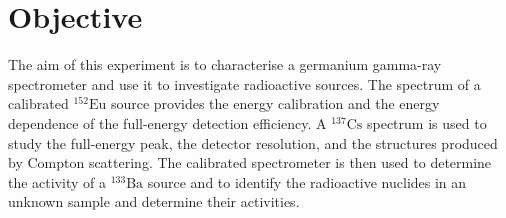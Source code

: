 \section{Objective}
\label{sec:objective}

The aim of this experiment is to characterise a germanium gamma-ray spectrometer
and use it to investigate radioactive sources. The spectrum of a calibrated
$^{152}\mathrm{Eu}$ source provides the energy calibration and the energy
dependence of the full-energy detection efficiency. A $^{137}\mathrm{Cs}$
spectrum is used to study the full-energy peak, the detector resolution, and
the structures produced by Compton scattering. The calibrated spectrometer is
then used to determine the activity of a $^{133}\mathrm{Ba}$ source and to
identify the radioactive nuclides in an unknown sample and determine their
activities.
